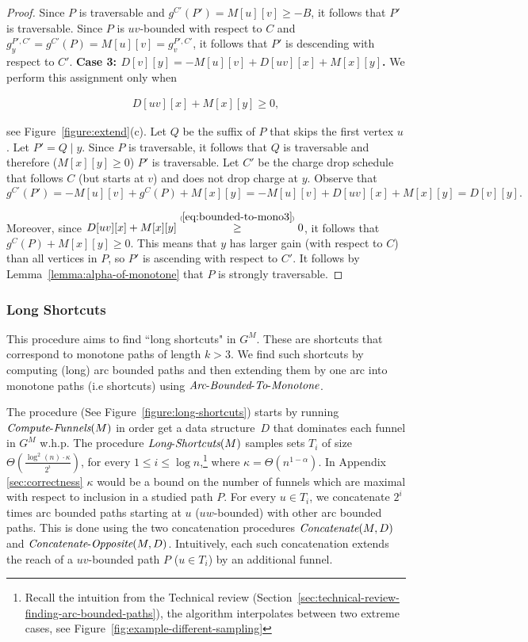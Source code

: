 \documentclass[11pt]{article}
\newcommand{\Concat}{\mbox{{\it Concatenate}}}
\newcommand{\CO}{\mbox{{\it Concatenate}-{\it Opposite}}}
\newcommand{\LS}{\mbox{{\it Long}-{\it Shortcuts}}}
\newcommand{\ComputeF}{\mbox{{\it Compute}-{\it Funnels}}}
\newcommand{\Extend}{\mbox{{\it Arc}-{\it Bounded}-{\it To}-{\it Monotone}}}
\newcommand\numge[1]{\stackrel{\scriptscriptstyle(\mkern-1.5mu#1\mkern-1.5mu)}{\ge}}
\begin{document}
\begin{proof}
   Since $P$ is traversable and $g^{C'}(P') = M[u][v]\ge - B$, it follows that $P'$ is traversable.
    Since $P$ is $uv$-bounded with respect to $C$ and $g^{P',C'}_y = g^{C'}(P)= M[u][v]= g^{P',C'}_v$, it follows that $P'$ is descending with respect to $C'$.
    \textbf{Case 3: $D[v][y] = -M[u][v]+D[uv][x] + M[x][y]$.} We perform this assignment only when 
    
    \begin{align}\label{eq:bounded-to-mono3}
        D[uv][x] + M[x][y] \ge 0,
    \end{align}
    
    see Figure~\ref{figure:extend}(c). Let $Q$ be the suffix of $P$ that skips the first vertex $u$. Let $P'= Q\mid y$.  Since $P$ is traversable, it follows that $Q$ is traversable and therefore ($M[x][y]\ge 0$) $P'$ is traversable. Let $C'$ be the charge drop schedule that follows $C$ (but starts at $v$) and does not drop charge at $y$.
    Observe that 
    \[g^{C'}(P') = -M[u][v] + g^C(P)+M[x][y]  = -M[u][v]+D[uv][x]+M[x][y] = D[v][y].\] 
    
    Moreover, since $D[uv][x] + M[x][y] \numge{\ref{eq:bounded-to-mono3}} 0$, it follows that $g^C(P) + M[x][y] \ge 0$. This means that $y$ has larger gain (with respect to $C$) than all vertices in $P$, so $P'$ is ascending with respect to $C'$.
     It follows by Lemma~\ref{lemma:alpha-of-monotone} that $P$ is strongly traversable. 
\end{proof}

\subsubsection{Long Shortcuts}\label{section:long}

This procedure aims to find ``long shortcuts" in $G^M$. These are shortcuts that correspond to monotone paths of length $k>3$. We find such shortcuts by computing (long) arc bounded paths and then extending them by one arc into monotone paths (i.e  shortcuts) using $\Extend$.

The procedure (See Figure~\ref{figure:long-shortcuts}) starts by running $\ComputeF(M)$ in order get a data structure~$D$ that dominates each funnel in $G^M$ w.h.p. 
The procedure $\LS(M)$ samples sets $T_i$ of size $\Theta(\frac{\log^2 (n) \cdot \kappa }{2^i})$, for every $1\le i \le \log n$,\footnote{Recall the intuition from the Technical review (Section~\ref{sec:technical-review-finding-arc-bounded-paths}), the algorithm interpolates between two extreme cases, see Figure~\ref{fig:example-different-sampling}} where $\kappa=\Theta(n^{1-\alpha})$. In Appendix \ref{sec:correctness}  $\kappa$  would be a bound on the number of funnels which are maximal with respect to inclusion in a studied path $P$. For every $u\in T_i$, we concatenate $2^i$ times arc bounded paths starting at $u$ ($uw$-bounded) with other arc bounded paths. This is done using the two concatenation procedures $\Concat(M,D)$ and $\CO(M,D)$. Intuitively, each such concatenation extends the reach of a $uv$-bounded path $P$ ($u\in T_i$) by an additional funnel. 
\end{document}
